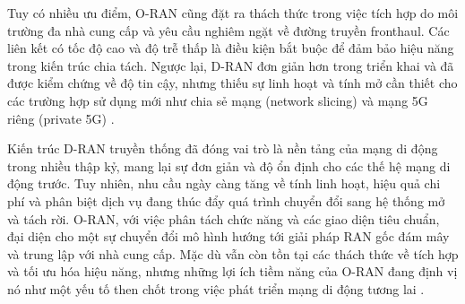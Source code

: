 Tuy có nhiều ưu điểm, O-RAN cũng đặt ra thách thức trong việc tích hợp do môi trường đa nhà cung cấp và yêu cầu nghiêm ngặt về đường truyền fronthaul. Các liên kết có tốc độ cao và độ trễ thấp là điều kiện bắt buộc để đảm bảo hiệu năng trong kiến trúc chia tách. Ngược lại, D-RAN đơn giản hơn trong triển khai và đã được kiểm chứng về độ tin cậy, nhưng thiếu sự linh hoạt và tính mở cần thiết cho các trường hợp sử dụng mới như chia sẻ mạng (network slicing) và mạng 5G riêng (private 5G) \cite{ericsson-openran}.

Kiến trúc D-RAN truyền thống đã đóng vai trò là nền tảng của mạng di động trong nhiều thập kỷ, mang lại sự đơn giản và độ ổn định cho các thế hệ mạng di động trước. Tuy nhiên, nhu cầu ngày càng tăng về tính linh hoạt, hiệu quả chi phí và phân biệt dịch vụ đang thúc đẩy quá trình chuyển đổi sang hệ thống mở và tách rời. O-RAN, với việc phân tách chức năng và các giao diện tiêu chuẩn, đại diện cho một sự chuyển đổi mô hình hướng tới giải pháp RAN gốc đám mây và trung lập với nhà cung cấp. Mặc dù vẫn còn tồn tại các thách thức về tích hợp và tối ưu hóa hiệu năng, nhưng những lợi ích tiềm năng của O-RAN đang định vị nó như một yếu tố then chốt trong việc phát triển mạng di động tương lai \cite{khurshid2024oran}.